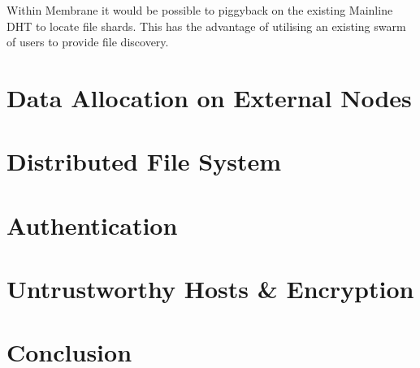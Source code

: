 \documentclass[a4paper,11pt, twocolumn]{report}
\begin{document}
Within Membrane it would be possible to piggyback on the existing Mainline DHT to locate file shards. This has the advantage of utilising an existing swarm of users to provide file discovery.

\section{Data Allocation on External Nodes}



\section{Distributed File System}

\section{Authentication}

\section{Untrustworthy Hosts \& Encryption}

\section{Conclusion}


\end{document}

